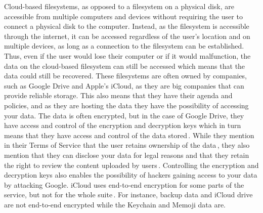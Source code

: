 Cloud-based filesystems, as opposed to a filesystem on a physical disk, are accessible from multiple computers and devices without requiring the user to connect a physical disk to the computer. Instead, as the filesystem is accessible through the internet, it can be accessed regardless of the user's location and on multiple devices, as long as a connection to the filesystem can be established. Thus, even if the user would lose their computer or if it would malfunction, the data on the cloud-based filesystem can still be accessed which means that the data could still be recovered. These filesystems are often owned by companies, such as Google Drive and Apple's iCloud, as they are big companies that can provide reliable storage. This also means that they have their agenda and policies, and as they are hosting the data they have the possibility of accessing your data. The data is often encrypted, but in the case of Google Drive, they have access and control of the encryption and decryption keys which in turn means that they have access and control of the data stored\,\cite{johnsonGoogleDriveSecure2021}. While they mention in their Terms of Service that the user retains ownership of the data\,\cite{googleGoogleDriveTerms}, they also mention that they can disclose your data for legal reasons and that they retain the right to review the content uploaded by users\,\cite{googleGoogleTermsService}. Controlling the encryption and decryption keys also enables the possibility of hackers gaining access to your data by attacking Google. iCloud uses end-to-end encryption for some parts of the service, but not for the whole suite\,\cite{appleinc.ICloudSecurityOverview}. For instance, backup data and iCloud drive are not end-to-end encrypted while the Keychain and Memoji data are.

